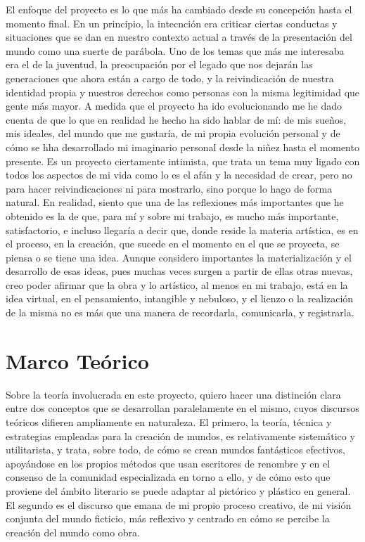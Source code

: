 El enfoque del proyecto es lo que más ha cambiado desde su concepción
hasta el momento final. En un principio, la intecnción era criticar
ciertas conductas y situaciones que se dan en nuestro contexto actual a
través de la presentación del mundo como una suerte de parábola. Uno de
los temas que más me interesaba era el de la juventud, la preocupación
por el legado que nos dejarán las generaciones que ahora están a cargo
de todo, y la reivindicación de nuestra identidad propia y nuestros
derechos como personas con la misma legitimidad que gente más mayor. A
medida que el proyecto ha ido evolucionando me he dado cuenta de que lo
que en realidad he hecho ha sido hablar de mí: de mis sueños, mis
ideales, del mundo que me gustaría, de mi propia evolución personal y de
cómo se hha desarrollado mi imaginario personal desde la niñez hasta el
momento presente. Es un proyecto ciertamente intimista, que trata un
tema muy ligado con todos los aspectos de mi vida como lo es el afán y
la necesidad de crear, pero no para hacer reivindicaciones ni para
mostrarlo, sino porque lo hago de forma natural. En realidad, siento que
una de las reflexiones más importantes que he obtenido es la de que,
para mí y sobre mi trabajo, es mucho más importante, satisfactorio, e
incluso llegaría a decir que, donde reside la materia artística, es en
el proceso, en la creación, que sucede en el momento en el que se
proyecta, se piensa o se tiene una idea. Aunque considero importantes la
materialización y el desarrollo de esas ideas, pues muchas veces surgen
a partir de ellas otras nuevas, creo poder afirmar que la obra y lo
artístico, al menos en mi trabajo, está en la idea virtual, en el
pensamiento, intangible y nebuloso, y el lienzo o la realización de la
misma no es más que una manera de recordarla, comunicarla, y
registrarla.

\hypertarget{marco-teuxf3rico}{%
\section{Marco Teórico}\label{marco-teuxf3rico}}

Sobre la teoría involucrada en este proyecto, quiero hacer una
distinción clara entre dos conceptos que se desarrollan paralelamente en
el mismo, cuyos discursos teóricos difieren ampliamente en naturaleza.
El primero, la teoría, técnica y estrategias empleadas para la creación
de mundos, es relativamente sistemático y utilitarista, y trata, sobre
todo, de cómo se crean mundos fantásticos efectivos, apoyándose en los
propios métodos que usan escritores de renombre y en el consenso de la
comunidad especializada en torno a ello, y de cómo esto que proviene del
ámbito literario se puede adaptar al pictórico y plástico en general. El
segundo es el discurso que emana de mi propio proceso creativo, de mi
visión conjunta del mundo ficticio, más reflexivo y centrado en cómo se
percibe la creación del mundo como obra.

